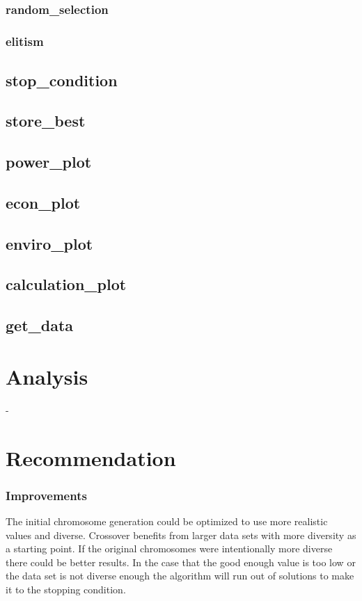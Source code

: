 \documentclass{article}
\begin{document}
    \subsection{}
        \subsubsection{random\_selection}
        \subsubsection{elitism}
    \subsection{stop\_condition}
    \subsection{store\_best}
    \subsection{power\_plot}
    \subsection{econ\_plot}
    \subsection{enviro\_plot}
    \subsection{calculation\_plot}
    \subsection{get\_data}


\setcounter{section}{4}
\section{Analysis}
-

\section{Recommendation}
    \subsubsection{Improvements}
    The initial chromosome generation could be optimized to use more realistic values and diverse.  Crossover benefits from larger data sets with more diversity as a starting point.  If the original chromosomes were intentionally more diverse there could be better results.  In the case that the good enough value is too low or the data set is not diverse enough the algorithm will run out of solutions to make it to the stopping condition.
\end{document}

